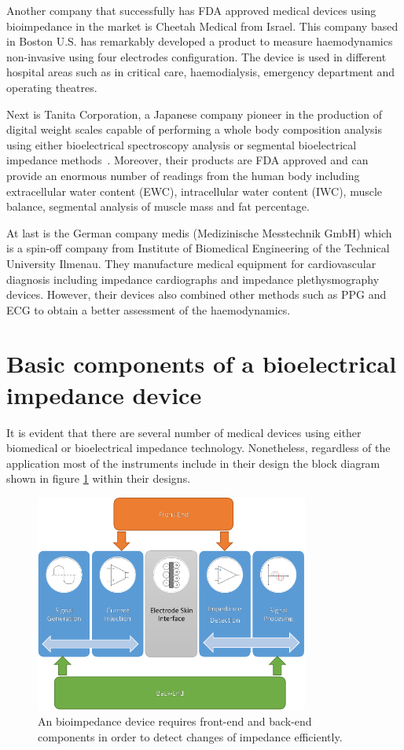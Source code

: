 Another company that successfully has FDA approved medical devices using bioimpedance in the market is Cheetah Medical \cite{cheetah} from Israel. This company based in Boston U.S. has remarkably developed a product to measure haemodynamics non-invasive using four electrodes configuration. The device is used in different hospital areas such as in critical care, haemodialysis, emergency department and operating theatres.

Next is Tanita Corporation, a Japanese company pioneer in the production of digital weight scales capable of performing a whole body composition analysis using either bioelectrical spectroscopy analysis or segmental bioelectrical impedance methods~\cite{tanita}. Moreover, their products are FDA approved and can provide an enormous number of readings from the human body including extracellular water content (EWC), intracellular water content (IWC), muscle balance, segmental analysis of muscle mass and fat percentage.

At last is the German company medis (Medizinische Messtechnik GmbH) which is a spin-off company from Institute of Biomedical Engineering of the Technical University Ilmenau. They manufacture medical equipment for cardiovascular diagnosis including impedance cardiographs and impedance plethysmography devices. However, their devices also combined other methods such as PPG and ECG to obtain a better assessment of the haemodynamics. 

\section{Basic components of a bioelectrical impedance device}
\label{section impedance basic}
It is evident that there are several number of medical devices using either biomedical or bioelectrical impedance technology. Nonetheless, regardless of the application most of the instruments include in their design the block diagram shown in figure \ref{fig:block diagram bioimpedance} within their designs. 

\begin{figure}[!htpb]
	\centering
	\includegraphics[width=9cm,keepaspectratio]{figure11}    
	\caption[Block diagram of a common bioimpedance device]{An bioimpedance device requires front-end and back-end components in order to detect changes of impedance efficiently.}
	\label{fig:block diagram bioimpedance}
\end{figure}

